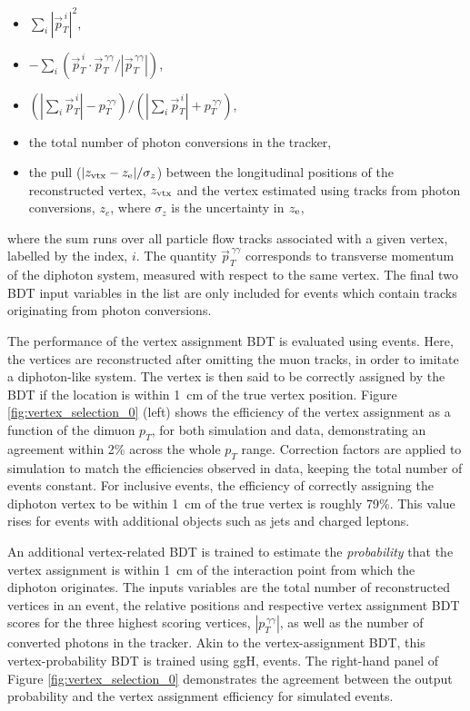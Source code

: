 \begin{itemize}
    \item $\sum_i |\vec{p}^{\,i}_T|^2$,
    \item $-\sum_i (\vec{p}^{\,i}_T\cdot \vec{p}_T^{\,\gamma\gamma}/|\vec{p}_T^{\,\gamma\gamma}|)$,
    \item $(|\sum_i \vec{p}^{\,i}_T| - p_T^{\,\gamma\gamma})/(|\sum_i \vec{p}^{\,i}_T| + p_T^{\,\gamma\gamma})$,
    \item the total number of photon conversions in the tracker,
    \item the pull ($|z_{\rm{vtx}}-z_{\rm{e}}|/\sigma_z$) between the longitudinal positions of the reconstructed vertex, $z_{\rm{vtx}}$ and the vertex estimated using tracks from photon conversions, $z_e$, where $\sigma_z$ is the uncertainty in $z_{\rm{e}}$,
\end{itemize}

\noindent
where the sum runs over all particle flow tracks associated with a given vertex, labelled by the index, $i$. The quantity $\vec{p}_T^{\,\gamma\gamma}$ corresponds to transverse momentum of the diphoton system, measured with respect to the same vertex. The final two BDT input variables in the list are only included for events which contain tracks originating from photon conversions. 

The performance of the vertex assignment BDT is evaluated using \Zmumu events. Here, the vertices are reconstructed after omitting the muon tracks, in order to imitate a diphoton-like system. The vertex is then said to be correctly assigned by the BDT if the location is within 1~cm of the true vertex position. Figure \ref{fig:vertex_selection_0} (left) shows the efficiency of the vertex assignment as a function of the dimuon $p_T$, for both simulation and data, demonstrating an agreement within 2\% across the whole $p_T$ range. Correction factors are applied to simulation to match the efficiencies observed in data, keeping the total number of events constant. For inclusive \Hgg events, the efficiency of correctly assigning the diphoton vertex to be within 1~cm of the true vertex is roughly 79\%. This value rises for events with additional objects such as jets and charged leptons.

An additional vertex-related BDT is trained to estimate the \textit{probability} that the vertex assignment is within 1~cm of the interaction point from which the diphoton originates. The inputs variables are the total number of reconstructed vertices in an event, the relative positions and respective vertex assignment BDT scores for the three highest scoring vertices, $|{p}_T^{\,\gamma\gamma}|$, as well as the number of converted photons in the tracker. Akin to the vertex-assignment BDT, this vertex-probability BDT is trained using ggH, \Hgg events. The right-hand panel of Figure \ref{fig:vertex_selection_0} demonstrates the agreement between the output probability and the vertex assignment efficiency for simulated \Zmumu events.

